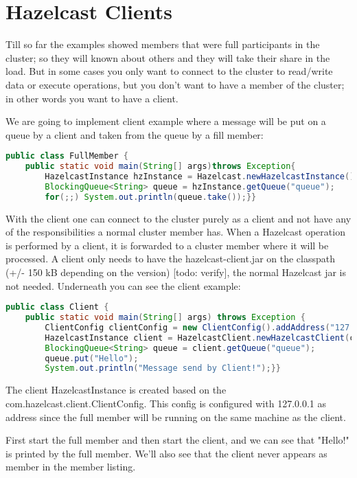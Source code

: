\chapter{Hazelcast Clients}
Till so far the examples showed members that were full participants in the cluster; so they will known about others and they will take their share in the load. But in some cases you only want to connect to the cluster to read/write data or execute operations, but you don't want to have a member of the cluster; in other words you want to have a client.

We are going to implement client example where a message will be put on a queue by a client and taken from the queue by a fill member:
\begin{lstlisting}[language=java]
public class FullMember {
    public static void main(String[] args)throws Exception{
        HazelcastInstance hzInstance = Hazelcast.newHazelcastInstance();
        BlockingQueue<String> queue = hzInstance.getQueue("queue");
        for(;;) System.out.println(queue.take());}}
\end{lstlisting}

With the client one can connect to the cluster purely as a client and not have any of the responsibilities a normal cluster member has. When a Hazelcast operation is performed by a client, it is forwarded to a cluster member where it will be processed. A client only needs to have the hazelcast-client.jar on the classpath (+/- 150 kB depending on the version) [todo: verify], the normal Hazelcast jar is not needed. Underneath you can see the client example:
\begin{lstlisting}[language=java]
public class Client {
    public static void main(String[] args) throws Exception {
        ClientConfig clientConfig = new ClientConfig().addAddress("127.0.0.1");
        HazelcastInstance client = HazelcastClient.newHazelcastClient(clientConfig);
        BlockingQueue<String> queue = client.getQueue("queue");
        queue.put("Hello");
        System.out.println("Message send by Client!");}}
\end{lstlisting}
The client HazelcastInstance is created based on the com.hazelcast.client.ClientConfig. This config is configured with 127.0.0.1 as address since the full member will be running on the same machine as the client.

First start the full member and then start the client, and we can see that "Hello!" is printed by the full member. We'll also see that the client never appears as member in the member listing.	
 
